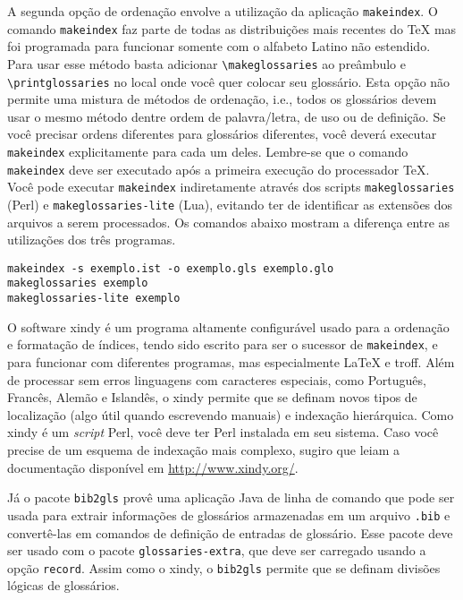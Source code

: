 A segunda opção de ordenação envolve a utilização da aplicação \texttt{makeindex}. O comando \texttt{makeindex} faz parte de todas as distribuições mais recentes do \TeX{} mas foi programada para funcionar somente com o alfabeto Latino não estendido. Para usar esse método basta adicionar \texttt{\textbackslash{}makeglossaries} ao preâmbulo e \texttt{\textbackslash{}printglossaries} no local onde você quer colocar seu glossário. Esta opção não permite uma mistura de métodos de ordenação, i.e., todos os glossários devem usar o mesmo método dentre ordem de palavra/letra, de uso ou de definição. Se você precisar ordens diferentes para glossários diferentes, você deverá executar \texttt{makeindex} explicitamente para cada um deles. Lembre-se que o comando \texttt{makeindex} deve ser executado após a primeira execução do processador \TeX{}. Você pode executar \texttt{makeindex} indiretamente através dos scripts \texttt{makeglossaries} (Perl) e \texttt{makeglossaries-lite} (Lua), evitando ter de identificar as extensões dos arquivos a serem processados. Os comandos abaixo mostram a diferença entre as utilizações dos três programas.

\begin{adjustbox}{fbox, center, tabular=l, vspace=0.5cm}
	\texttt{makeindex -s exemplo.ist -o exemplo.gls exemplo.glo} \\
	\texttt{makeglossaries exemplo} \\
	\texttt{makeglossaries-lite exemplo}
\end{adjustbox}

O software \gls{xindy} é um programa altamente configurável usado para a ordenação e formatação de índices, tendo sido escrito para ser o sucessor de \texttt{makeindex}, e para funcionar com diferentes programas, mas especialmente \LaTeX{} e troff. Além de processar sem erros linguagens com caracteres especiais, como Português, Francês, Alemão e Islandês, o \gls{xindy} permite que se definam novos tipos de localização (algo útil quando escrevendo manuais) e indexação hierárquica. Como \gls{xindy} é um \textit{script} Perl, você deve ter Perl instalada em seu sistema. Caso você precise de um esquema de indexação mais complexo, sugiro que leiam a documentação disponível em \url{http://www.xindy.org/}.

Já o pacote \texttt{bib2gls} provê uma aplicação Java de linha de comando que pode ser usada para extrair informações de glossários armazenadas em um arquivo \texttt{.bib} e convertê-las em comandos de definição de entradas de glossário. Esse pacote deve ser usado com o pacote \texttt{glossaries-extra}, que deve ser carregado usando a opção \texttt{record}. Assim como o \gls{xindy}, o \texttt{bib2gls} permite que se definam divisões lógicas de glossários.

